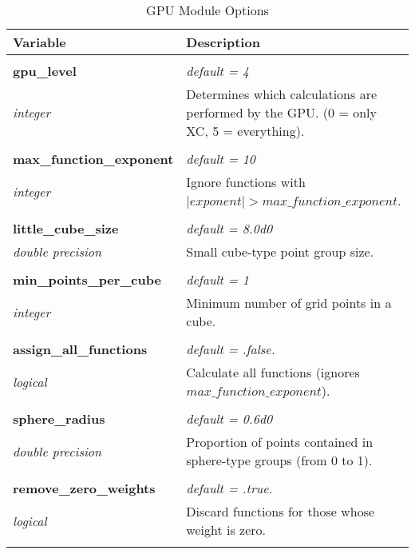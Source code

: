 \begin{Spacing}{1.0}
\begin{longtable}{ p{} p{} }

   \toprule
   \textbf{Variable} & Description \\*
   \midrule \\*
   \endhead

   \bottomrule
   \caption{GPU Module Options}
   \endfoot

   \textbf{gpu\_level}
   &  \textit{default = 4}
   \\*\textit{integer}
   & Determines which calculations are performed by
   the GPU. (0 = only XC, 5 = everything).\\*\\

   \textbf{max\_function\_exponent}
   &  \textit{default = 10}
   \\*\textit{integer}
   & Ignore functions with $\lvert exponent \rvert > 
   max\_function\_exponent$.\\* \\

   \textbf{little\_cube\_size}
   &  \textit{default = 8.0d0}
   \\*\textit{double precision}
   & Small cube-type point group size.\\* \\

   \textbf{min\_points\_per\_cube}
   &  \textit{default = 1}
   \\*\textit{integer}
   & Minimum number of grid points in a cube.\\* \\

   \textbf{assign\_all\_functions}
   &  \textit{default = .false. }
   \\*\textit{logical}
   & Calculate all functions (ignores
   $max\_function\_exponent$).\\* \\

   \textbf{sphere\_radius}
   &  \textit{default = 0.6d0}
   \\*\textit{double precision}
   & Proportion of points contained in sphere-type groups (from 0 to 1).\\* \\

   \textbf{remove\_zero\_weights}
   &  \textit{default = .true. }
   \\*\textit{logical}
   & Discard functions for those whose weight is zero.
   \\* \\


\end{longtable}
\end{Spacing}
